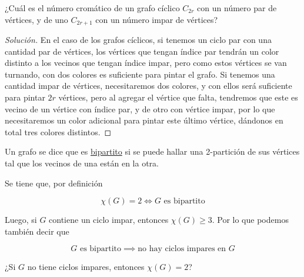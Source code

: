 \begin{prob}
    ¿Cuál es el número cromático de un grafo cíclico $C_{2r}$ con un número par de vértices, y de uno $C_{2r+1}$ con un número impar de vértices?
\end{prob}

\begin{proof}[Solución]
    En el caso de los grafos cíclicos, si tenemos un ciclo par con una cantidad par de vértices, los vértices que tengan índice par tendrán un color distinto a los vecinos que tengan índice impar, pero como estos vértices se van turnando, con dos colores es suficiente para pintar el grafo. Si tenemos una cantidad impar de vértices, necesitaremos dos colores, y con ellos será suficiente para pintar $2r$ vértices, pero al agregar el vértice que falta, tendremos que este es vecino de un vértice con índice par, y de otro con vértice impar, por lo que necesitaremos un color adicional para pintar este último vértice, dándonos en total tres colores distintos.
\end{proof}

\begin{defn}
    Un grafo se dice que es \ul{bipartito} si se puede hallar una 2-partición de sus vértices tal que los vecinos de una están en la otra.
    
    Se tiene que, por definición
    
    \[
    \chi(G) = 2 \iff \text{$G$ es bipartito}
    \]
\end{defn}

Luego, si $G$ contiene un ciclo impar, entonces $\chi(G) \geq 3$. Por lo que podemos también decir que 

\[
\text{$G$ es bipartito} \implies \text{no hay ciclos impares en $G$}
\]

\begin{pre}
    ¿Si $G$ no tiene ciclos impares, entonces $\chi(G) = 2$?
\end{pre}
    
